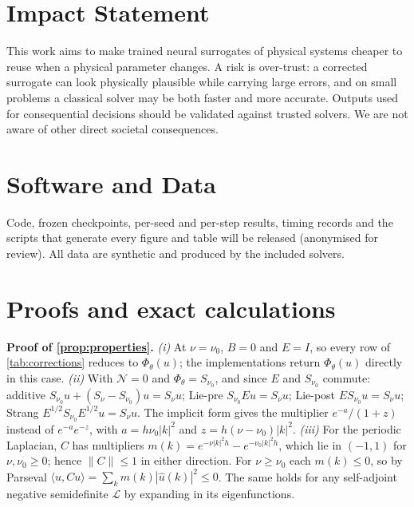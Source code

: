 \documentclass{article}
\theoremstyle{plain}
\newcommand{\N}{\mathcal{N}}
\newcommand{\Lop}{\mathcal{L}}
\begin{document}
\section*{Impact Statement}
This work aims to make trained neural surrogates of physical systems cheaper to reuse when a physical parameter changes.
A risk is over-trust: a corrected surrogate can look physically plausible while carrying large errors, and on small problems a classical solver may be both faster and more accurate.
Outputs used for consequential decisions should be validated against trusted solvers.
We are not aware of other direct societal consequences.

\section*{Software and Data}
Code, frozen checkpoints, per-seed and per-step results, timing records and the scripts that generate every figure and table will be released (anonymised for review). All data are synthetic and produced by the included solvers.




\newpage
\appendix
\onecolumn

\section{Proofs and exact calculations}
\label{app:proofs}

\textbf{Proof of \cref{prop:properties}.}
\emph{(i)} At $\nu=\nu_0$, $B=0$ and $E=I$, so every row of \cref{tab:corrections} reduces to $\Phi_\theta(u)$; the implementations return $\Phi_\theta(u)$ directly in this case.
\emph{(ii)} With $\N=0$ and $\Phi_\theta=S_{\nu_0}$, and since $E$ and $S_{\nu_0}$ commute: additive $S_{\nu_0}u+(S_\nu-S_{\nu_0})u=S_\nu u$; Lie-pre $S_{\nu_0}Eu=S_\nu u$; Lie-post $ES_{\nu_0}u=S_\nu u$; Strang $E^{1/2}S_{\nu_0}E^{1/2}u=S_\nu u$. The implicit form gives the multiplier $e^{-a}/(1+z)$ instead of $e^{-a}e^{-z}$, with $a=h\nu_0|k|^2$ and $z=h(\nu-\nu_0)|k|^2$.
\emph{(iii)} For the periodic Laplacian, $C$ has multipliers $m(k)=e^{-\nu|k|^2h}-e^{-\nu_0|k|^2h}$, which lie in $(-1,1)$ for $\nu,\nu_0\ge0$; hence $\|C\|\le1$ in either direction. For $\nu\ge\nu_0$ each $m(k)\le0$, so by Parseval $\langle u,Cu\rangle=\sum_k m(k)|\hat u(k)|^2\le0$. The same holds for any self-adjoint negative semidefinite $\Lop$ by expanding in its eigenfunctions.
\end{document}
